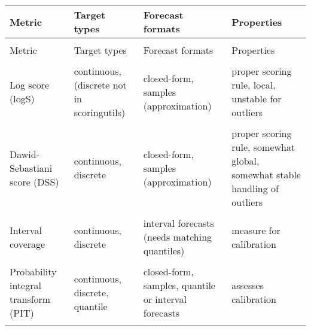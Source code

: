 \documentclass{article}
\begin{document}
\begin{longtable}[t]{>{\raggedright\arraybackslash}p{2.5cm}>{\raggedright\arraybackslash}p{2cm}>{\raggedright\arraybackslash}p{4.5cm}>{\raggedright\arraybackslash}p{4cm}}
\toprule
Metric & Target types & Forecast formats & Properties\\
\midrule
\endfirsthead
\multicolumn{4}{@{}l}{\textit{(continued)}}\\
\toprule
Metric & Target types & Forecast formats & Properties\\
\midrule
\endhead

\endfoot
\bottomrule
\endlastfoot
\cellcolor{gray!6}{(Continuous) ranked probability score (CRPS)} & \cellcolor{gray!6}{continuous, discrete} & \cellcolor{gray!6}{closed-form, samples (approximation)} & \cellcolor{gray!6}{proper scoring rule, global, stable handling of outliers}\\
\addlinespace
Log score (logS) & continuous, (discrete not in scoringutils) & closed-form, samples (approximation) & proper scoring rule, local, unstable for outliers\\
\addlinespace
\cellcolor{gray!6}{(Weighted) interval score (WIS)} & \cellcolor{gray!6}{continuous, discrete} & \cellcolor{gray!6}{quantile or interval predictions} & \cellcolor{gray!6}{proper scoring rule, global, stable handling of outliers, converges to crps}\\
\addlinespace
Dawid-Sebastiani score (DSS) & continuous, discrete & closed-form, samples (approximation) & proper scoring rule, somewhat global, somewhat stable handling of outliers\\
\addlinespace
\cellcolor{gray!6}{Brier score (BS)} & \cellcolor{gray!6}{binary} & \cellcolor{gray!6}{binary probabilities} & \cellcolor{gray!6}{proper scoring rule}\\
\addlinespace
Interval coverage & continuous, discrete & interval forecasts (needs matching quantiles) & measure for calibration\\
\addlinespace
\cellcolor{gray!6}{Quantile coverage} & \cellcolor{gray!6}{continuous, discrete} & \cellcolor{gray!6}{quantile or interval forecasts} & \cellcolor{gray!6}{measure for calibration}\\
\addlinespace
Probability integral transform (PIT) & continuous, discrete, quantile & closed-form, samples, quantile or interval forecasts & assesses calibration\\
\addlinespace
\cellcolor{gray!6}{Sharpness} & \cellcolor{gray!6}{continuous, discrete} & \cellcolor{gray!6}{closed-form, samples, quantile or interval forecasts} & \cellcolor{gray!6}{measures sharpness, slightly different depending on forecast format}\\

\end{longtable}
\end{document}

